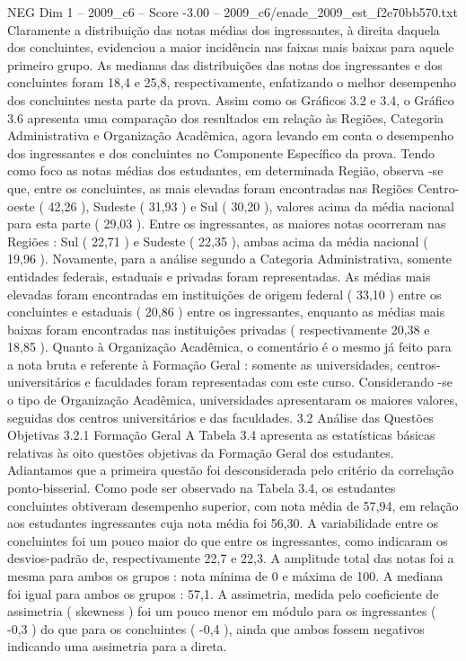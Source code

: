 \begin{textsample}{NEG Dim 1 – 2009\_c6 – Score -3.00 – 2009\_c6/enade\_2009\_est\_f2e70bb570.txt}
Claramente a distribuição das notas médias dos ingressantes, à direita daquela dos concluintes, evidenciou a maior incidência nas faixas mais baixas para aquele primeiro grupo.
As medianas das distribuições das notas dos ingressantes e dos concluintes foram 18,4 e 25,8, respectivamente, enfatizando o melhor desempenho dos concluintes nesta parte da prova.
Assim como os Gráficos 3.2 e 3.4, o Gráfico 3.6 apresenta uma comparação dos resultados em relação às Regiões, Categoria Administrativa e Organização Acadêmica, agora levando em conta o desempenho dos ingressantes e dos concluintes no Componente Específico da prova.
Tendo como foco as notas médias dos estudantes, em determinada Região, observa -se que, entre os concluintes, as mais elevadas foram encontradas nas Regiões Centro-oeste ( 42,26 ), Sudeste ( 31,93 ) e Sul ( 30,20 ), valores acima da média nacional para esta parte ( 29,03 ).
Entre os ingressantes, as maiores notas ocorreram nas Regiões : Sul ( 22,71 ) e Sudeste ( 22,35 ), ambas acima da média nacional ( 19,96 ).
Novamente, para a análise segundo a Categoria Administrativa, somente entidades federais, estaduais e privadas foram representadas.
As médias mais elevadas foram encontradas em instituições de origem federal ( 33,10 ) entre os concluintes e estaduais ( 20,86 ) entre os ingressantes, enquanto as médias mais baixas foram encontradas nas instituições privadas ( respectivamente 20,38 e 18,85 ).
Quanto à Organização Acadêmica, o comentário é o mesmo já feito para a nota bruta e referente à Formação Geral : somente as universidades, centros-universitários e faculdades foram representadas com este curso.
Considerando -se o tipo de Organização Acadêmica, universidades apresentaram os maiores valores, seguidas dos centros universitários e das faculdades. 3.2 Análise das Questões Objetivas 3.2.1 Formação Geral A Tabela 3.4 apresenta as estatísticas básicas relativas às oito questões objetivas da Formação Geral dos estudantes.
Adiantamos que a primeira questão foi desconsiderada pelo critério da correlação ponto-bisserial.
Como pode ser observado na Tabela 3.4, os estudantes concluintes obtiveram desempenho superior, com nota média de 57,94, em relação aos estudantes ingressantes cuja nota média foi 56,30.
A variabilidade entre os concluintes foi um pouco maior do que entre os ingressantes, como indicaram os desvios-padrão de, respectivamente 22,7 e 22,3.
A amplitude total das notas foi a mesma para ambos os grupos : nota mínima de 0 e máxima de 100.
A mediana foi igual para ambos os grupos : 57,1.
A assimetria, medida pelo coeficiente de assimetria ( skewness ) foi um pouco menor em módulo para os ingressantes ( -0,3 ) do que para os concluintes ( -0,4 ), ainda que ambos fossem negativos indicando uma assimetria para a direta.

\end{textsample}

